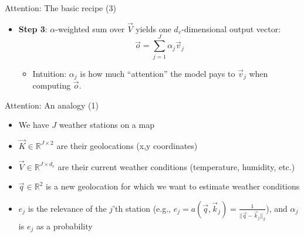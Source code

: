 \documentclass[11pt,compress,t,notes=noshow, xcolor=table]{beamer}
\begin{document}

\begin{vbframe}{Attention: The basic recipe (3)}

\vfill

\begin{itemize}
	\item \textbf{Step 3}: $\alpha$-weighted sum over $\vec {V}$ yields one $d_v$-dimensional output vector:
	$$\vec {o} = \sum_{j=1}^J \alpha_j \vec {v}_j$$
		\begin{itemize}
			\item Intuition: $\alpha_j$ is how much ``attention'' the model pays to $\vec v_j$ when computing $\vec o$.
		\end{itemize}
\end{itemize}

\vfill

\end{vbframe}


\begin{vbframe}{Attention: An analogy (1)}

\vfill

\begin{itemize}
\item We have $J$ weather stations on a map
\item $\vec K \in \mathbb{R}^{J\times 2}$ are their geolocations (x,y coordinates)
\item $\vec V \in \mathbb{R}^{J \times d_v}$ are their current weather conditions (temperature, humidity, etc.)
\item $\vec q \in \mathbb{R}^2$ is a new geolocation for which we want to estimate weather conditions
\item $e_j$ is the relevance of the $j$'th station (e.g., $e_j = a(\vec q, \vec k_j) = \frac{1}{||\vec q - \vec k_j||_2}$), and $\alpha_j$ is $e_j$ as a probability
\end{itemize}

\vfill

\end{vbframe}

\end{document}
